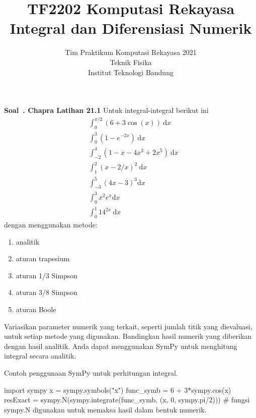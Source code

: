 \documentclass[a4paper,11pt,bahasa]{article} %
\newcounter{soal}%
\newenvironment{soal}[1][]{\refstepcounter{soal}\par\medskip
   \noindent \textbf{Soal~\thesoal. #1} \sffamily}{\medskip}
\begin{document}
\title{%
{\small TF2202 Komputasi Rekayasa}\\
Integral dan Diferensiasi Numerik
}
\author{Tim Praktikum Komputasi Rekayasa 2021\\
Teknik Fisika\\
Institut Teknologi Bandung}
\date{}
\maketitle

\begin{soal}[Chapra Latihan 21.1]
Untuk integral-integral berikut ini
\begin{align}
& \int_{0}^{\pi/2} (6 + 3\cos(x))\ \mathrm{d}x \\
& \int_{0}^{3} (1 - e^{-2x})\ \mathrm{d}x \\
& \int_{-2}^{4} (1 - x - 4x^3 + 2x^5)\ \mathrm{d}x \\
& \int_{1}^{2} (x - 2/x)^2\ \mathrm{d}x \\
& \int_{-3}^{5} (4x - 3)^3 \mathrm{d}x \\
& \int_{0}^{3} x^2 e^x \mathrm{d}x \\
& \int_{0}^{1} 14^{2x}\ \mathrm{d}x
\end{align}
dengan menggunakan metode:
\begin{enumerate}[label=(\alph*)]
\item analitik
\item aturan trapesium
\item aturan 1/3 Simpson
\item aturan 3/8 Simpson
\item aturan Boole
\end{enumerate}
Variasikan parameter numerik yang terkait, seperti jumlah titik yang dievaluasi,
untuk setiap metode yang digunakan.
Bandingkan hasil numerik yang diberikan dengan hasil analitik.
Anda dapat menggunakan SymPy untuk menghitung integral secara analitik.
\end{soal}

Contoh penggunaan SymPy untuk perhitungan integral.
\begin{pythoncode}
import sympy
x = sympy.symbols("x")
func_symb = 6 + 3*sympy.cos(x)
resExact = sympy.N(sympy.integrate(func_symb, (x, 0, sympy.pi/2)))
# fungsi sympy.N digunakan untuk memaksa hasil dalam bentuk numerik.
\end{pythoncode}
\end{document}
